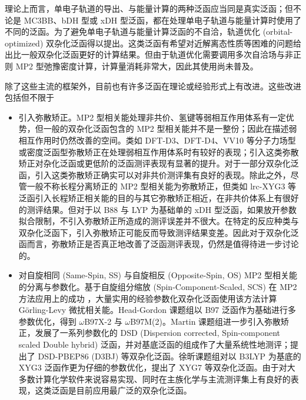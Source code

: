 理论上而言，单电子轨道的导出、与能量计算的两种泛函应当同是真实泛函；但不论是 MC3BB、bDH 型或 xDH 型泛函，都在处理单电子轨道与能量计算时使用了不同的泛函。为了避免单电子轨道与能量计算泛函的不自洽，轨道优化 (orbital-optimized) 双杂化泛函得以提出\cite{Hait-Head-Gordon.JCP.2018}。这类泛函有希望对近解离态性质等困难的问题给出比一般双杂化泛函更好的计算结果。但由于轨道优化需要调用多次自洽场与非正则 MP2 型弛豫密度计算，计算量消耗非常大，因此其使用尚未普及。

除了这些主流的框架外，目前也有许多泛函在理论或经验形式上有改进。这些改进包括但不限于
\begin{itemize}[nosep]
  \item 引入弥散矫正。MP2 型相关能处理非共价、氢键等弱相互作用体系有一定优势，但一般的双杂化泛函包含的 MP2 型相关能并不是一整份；因此在描述弱相互作用时仍然改善的空间。类如 DFT-D3\cite{Grimme-Goerigk.JCC.2011, Smith-Sherrill.JPCL.2016}、DFT-D4\cite{Caldeweyher-Grimme.JCP.2019}、VV10\cite{Vydrov-VanVoorhis.JCP.2010} 等分子力场型或密度泛函型弥散矫正在处理弱相互作用体系时有较好的表现；引入这类弥散矫正对杂化泛函或更低阶的泛函测评表现有显著的提升\cite{Goerigk-Grimme.PCCP.2017}。对于一部分双杂化泛函，引入这类弥散矫正确实可以对非共价测评集有良好的表现\cite{Grimme-Goerigk.JCC.2011, Santra-Martin.JPCA.2019}。除此之外，尽管一般不称长程分离矫正的 MP2 型相关能为弥散矫正，但类如 lrc-XYG3 等泛函引入长程矫正相关能的目的与其它弥散矫正相近，在非共价体系上有很好的测评结果\cite{Zhang-Xu.JPCL.2013}。但对于以 B88 与 LYP 为基础单的 xDH 型泛函，如果放开参数拟合限制，不引入弥散矫正所造成的测评误差并不很大\cite{Zhang-Xu.JPCL.2021, Santra-Martin.JPCL.2021}。在特定的反应种类与双杂化泛函下，引入弥散矫正可能反而导致测评结果变差\cite{Bremond-Adamo.JCP.2022}。因此对于双杂化泛函而言，弥散矫正是否真正地改善了泛函测评表现，仍然是值得待进一步讨论的。
  
  \item 对自旋相同 (Same-Spin, SS) 与自旋相反 (Opposite-Spin, OS) MP2 型相关能的分离与参数化。基于自旋组分缩放 (Spin-Component-Scaled, SCS) 在 MP2 方法应用上的成功 \cite{Grimme-Grimme.JCP.2003}，大量实用的经验参数化双杂化泛函使用该方法计算 G\"{o}rling-Levy 微扰相关能。Head-Gordon 课题组以 B97 泛函作为基础进行多参数优化，得到 $\omega$B97X-2\cite{Chai-Head-Gordon.JCP.2009} 与 $\omega$B97M(2)\cite{Mardirossian-Head-Gordon.JCP.2018}。Martin 课题组进一步引入弥散矫正，发展了一系列参数化的 DSD (Dispersion corrected, Spin-component scaled Double hybrid) 泛函，并对基底泛函的组成作了大量系统性地测评；提出了 DSD-PBEP86 (D3BJ)\cite{Kozuch-Martin.JCC.2013} 等双杂化泛函。徐昕课题组对以 B3LYP 为基底的 XYG3 泛函作更为仔细的参数优化，提出了 XYG7\cite{Zhang-Xu.JPCL.2021} 等双杂化泛函。由于对大多数计算化学软件来说容易实现、同时在主族化学与主流测评集上有良好的表现，这类泛函是目前应用最广泛的双杂化泛函。
  

\end{itemize}
